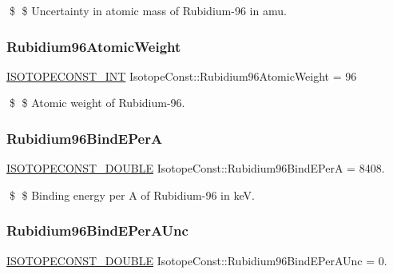 \$ \$ Uncertainty in atomic mass of Rubidium-\/96 in amu. \mbox{\label{group___isotope_const-_rubidium-_rb96_gaf6e26eac66918f9be2e5eb17493cef20}} 
\subsubsection{\texorpdfstring{Rubidium96\+Atomic\+Weight}{Rubidium96AtomicWeight}}
{\footnotesize\ttfamily \mbox{\hyperlink{group___isotope_const-_macros_ga5f18360b3e99483a35c32d789e62621c}{I\+S\+O\+T\+O\+P\+E\+C\+O\+N\+S\+T\+\_\+\+I\+NT}} Isotope\+Const\+::\+Rubidium96\+Atomic\+Weight = 96}

\$ \$ Atomic weight of Rubidium-\/96. \mbox{\label{group___isotope_const-_rubidium-_rb96_gac0233fc6fd34524aac8eb94b68111b43}} 
\subsubsection{\texorpdfstring{Rubidium96\+Bind\+E\+PerA}{Rubidium96BindEPerA}}
{\footnotesize\ttfamily \mbox{\hyperlink{group___isotope_const-_macros_ga8f45a7272ce02c0b4c65c44636ed719a}{I\+S\+O\+T\+O\+P\+E\+C\+O\+N\+S\+T\+\_\+\+D\+O\+U\+B\+LE}} Isotope\+Const\+::\+Rubidium96\+Bind\+E\+PerA = 8408.}

\$ \$ Binding energy per A of Rubidium-\/96 in keV. \mbox{\label{group___isotope_const-_rubidium-_rb96_gad9fbd2fc71f4efb30abb223ba5c4ce17}} 
\subsubsection{\texorpdfstring{Rubidium96\+Bind\+E\+Per\+A\+Unc}{Rubidium96BindEPerAUnc}}
{\footnotesize\ttfamily \mbox{\hyperlink{group___isotope_const-_macros_ga8f45a7272ce02c0b4c65c44636ed719a}{I\+S\+O\+T\+O\+P\+E\+C\+O\+N\+S\+T\+\_\+\+D\+O\+U\+B\+LE}} Isotope\+Const\+::\+Rubidium96\+Bind\+E\+Per\+A\+Unc = 0.}

